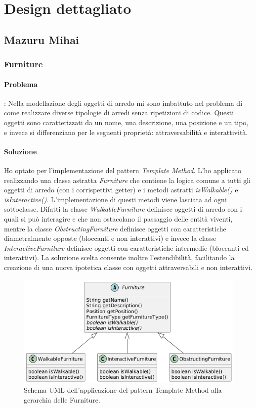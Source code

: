 \documentclass[a4paper,12pt]{report}
\begin{document}
\section{Design dettagliato}

\subsection{Mazuru Mihai}

\subsubsection{Furniture}
\paragraph{Problema}: Nella modellazione degli oggetti di arredo mi sono imbattuto nel problema 
di come realizzare diverse tipologie di arredi senza ripetizioni di codice. Questi oggetti 
sono caratterizzati da un nome, una descrizione, una posizione e un tipo, e invece si differenziano 
per le seguenti proprietà: attraversabilità e interattività.
\paragraph{Soluzione} Ho optato per l'implementazione del pattern \textit{Template Method}. 
L'ho applicato realizzando una classe astratta \textit{Furniture} che contiene la logica comune a 
tutti gli oggetti di arredo (con i corrispettivi getter) e i metodi astratti \textit{isWalkable()} e 
\textit{isInteractive()}. L'implementazione di questi metodi viene lasciata ad ogni sottoclasse.
Difatti la classe \textit{WalkableFurniture} definisce oggetti di arredo con i quali si può interagire e
che non ostacolano il passaggio delle entità viventi, mentre la classe \textit{ObstructingFurniture} 
definisce oggetti con caratteristiche diametralmente opposte (bloccanti e non interattivi) e 
invece la classe \textit{InteractiveFurniture} definisce oggetti con caratteristiche intermedie (bloccanti ed interattivi).
\newline La soluzione scelta consente inoltre l'estendibilità, facilitando la creazione di una nuova
ipotetica classe con oggetti attraversabili e non interattivi.

\begin{figure}[H]
	\centering{}
	\includegraphics[width=\textwidth]{img/template.png}
	\caption{Schema UML dell'applicazione del pattern Template Method alla gerarchia delle Furniture.}
	\label{img:template}
\end{figure}
\end{document}
